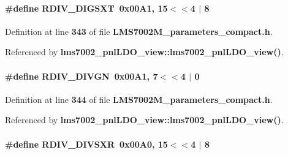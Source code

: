 \paragraph[{R\+D\+I\+V\+\_\+\+D\+I\+G\+S\+XT}]{\setlength{\rightskip}{0pt plus 5cm}\#define R\+D\+I\+V\+\_\+\+D\+I\+G\+S\+XT~0x00\+A1, 15$<$$<$4 $\vert$  8}\label{LMS7002M__parameters__compact_8h_a93b80f276ffde7cb1023e729c908e452}


Definition at line {\bf 343} of file {\bf L\+M\+S7002\+M\+\_\+parameters\+\_\+compact.\+h}.



Referenced by {\bf lms7002\+\_\+pnl\+L\+D\+O\+\_\+view\+::lms7002\+\_\+pnl\+L\+D\+O\+\_\+view()}.

\paragraph[{R\+D\+I\+V\+\_\+\+D\+I\+V\+GN}]{\setlength{\rightskip}{0pt plus 5cm}\#define R\+D\+I\+V\+\_\+\+D\+I\+V\+GN~0x00\+A1, 7$<$$<$4 $\vert$  0}\label{LMS7002M__parameters__compact_8h_ac1fc44c0e968884f34960f1735d464a2}


Definition at line {\bf 344} of file {\bf L\+M\+S7002\+M\+\_\+parameters\+\_\+compact.\+h}.



Referenced by {\bf lms7002\+\_\+pnl\+L\+D\+O\+\_\+view\+::lms7002\+\_\+pnl\+L\+D\+O\+\_\+view()}.

\paragraph[{R\+D\+I\+V\+\_\+\+D\+I\+V\+S\+XR}]{\setlength{\rightskip}{0pt plus 5cm}\#define R\+D\+I\+V\+\_\+\+D\+I\+V\+S\+XR~0x00\+A0, 15$<$$<$4 $\vert$  8}\label{LMS7002M__parameters__compact_8h_ae6c9ae7b45af60a5732f64506785dddc}


